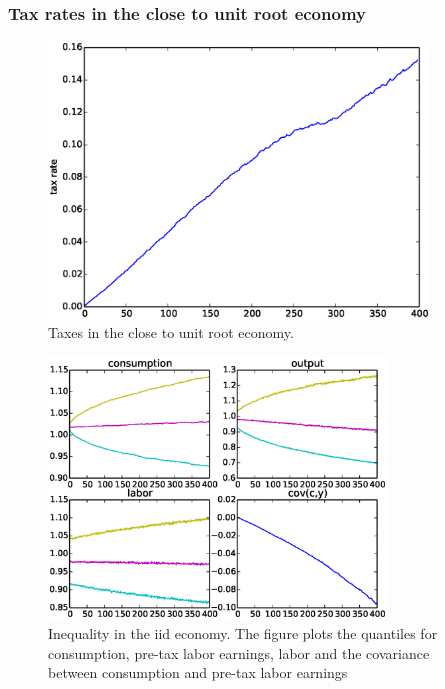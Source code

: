 \documentclass{beamer}
\begin{document}
\begin{frame}
\frametitle {Tax rates in the close to unit root economy}

  \begin{figure}[htp]
 \centering
 \includegraphics[width=0.9\textwidth]{Images/tax_pers.eps}
 \caption{Taxes in the close to unit root economy.}
 \label{fig:taxes_pers}
 \end{figure}
\end{frame}

\begin{frame}
  \begin{figure}[htp]
 \centering
 \includegraphics[width=0.8\textwidth]{Images/quant_iid.eps}
 \caption{Inequality in the iid economy. The figure plots the quantiles for consumption, pre-tax labor earnings, labor and the covariance between consumption and pre-tax labor earnings}
 \label{fig:quant_iid}
 \end{figure}
\end{frame}
\end{document}
